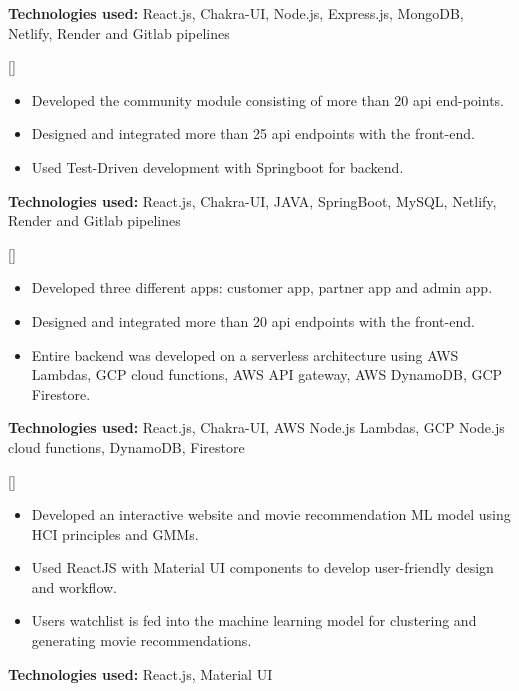 \documentclass{article}
\begin{document}
\textbf{Technologies used:} React.js, Chakra-UI, Node.js, Express.js, MongoDB, Netlify, Render and Gitlab pipelines

[] 
\item
\begin{itemize}
\item Developed the community module consisting of more than 20 api end-points.
\item Designed and integrated more than 25 api endpoints with the front-end.
\item Used Test-Driven development with Springboot for backend.

\end{itemize}

\textbf{Technologies used:} React.js, Chakra-UI, JAVA, SpringBoot, MySQL, Netlify, Render and Gitlab pipelines


[] 
\item
\begin{itemize}
\item Developed three different apps: customer app, partner app and admin app.
\item Designed and integrated more than 20 api endpoints with the front-end.
\item Entire backend was developed on a serverless architecture using AWS Lambdas, GCP cloud functions, AWS API gateway, AWS DynamoDB, GCP Firestore.

\end{itemize}

\textbf{Technologies used:} React.js, Chakra-UI, AWS Node.js Lambdas, GCP Node.js cloud functions, DynamoDB, Firestore

[]
\begin{itemize}
\item Developed an interactive website and movie recommendation ML model using HCI principles and GMMs.
\item Used ReactJS with Material UI components to develop user-friendly design and workflow.
\item Users watchlist is fed into the machine learning model for clustering and generating movie recommendations.
\end{itemize}
\textbf{Technologies used:} React.js, Material UI
\end{document}
